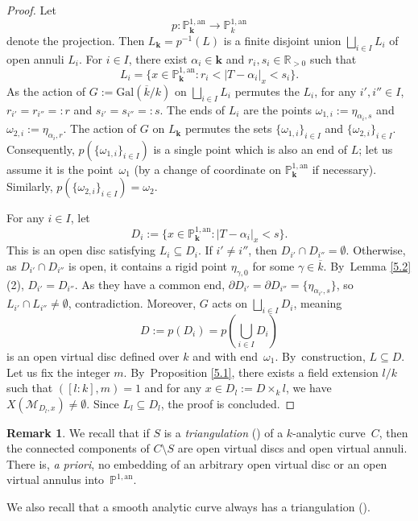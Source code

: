 \documentclass[JEP,XML,SOM,Unicode,NoFloatCountersInSection,published]{cedram}
\newcommand{\bbk}{{\boldsymbol{k}}}%
\let\backslash\setminus
\theoremstyle{definition}
\newtheorem{rem}[thm]{Remark}
\begin{document}
\begin{proof}
Let
\[
p: \mathbb{P}_{\bbk}^{1, \mathrm{an}} \to \mathbb{P}_k^{1, \mathrm{an}}
\]
denote the projection. Then $L_{\bbk}=p^{-1}(L)$ is a finite disjoint union $\bigsqcup_{i \in I} L_i$ of open annuli $L_i$. For $i \in I$, there exist $\alpha_i \in \bbk$ and $r_i, s_i \in \mathbb{R}_{>0}$ such that
\[
L_i=\{x \in \mathbb{P}_{\bbk}^{1, \mathrm{an}}: r_i < |T-\alpha_i|_x <s_i\}.
\]
As the action of $G:=\mathrm{Gal}(\overline{k}/k)$ on $\bigsqcup_{i \in I}L_i$ permutes the $L_i$, for any $i', i'' \in I$, $r_{i'}=r_{i''}=:r$ and $s_{i'}=s_{i''}=:s$. The ends of $L_i$ are the points $\omega_{1,i}:=\eta_{\alpha_i, s}$ and $\omega_{2,i}:=\eta_{\alpha_i,r}$. The action of $G$ on $L_{\bbk}$ permutes the sets $\{\omega_{1,i}\}_{i \in I}$ and $\{\omega_{2,i}\}_{i \in I}$. Consequently, $p(\{\omega_{1,i}\}_{i \in I})$ is a single point which is also an end of $L$; let us assume it is the point~$\omega_1$ (by a change of coordinate on $\mathbb{P}_{\bbk}^{1, \mathrm{an}}$ if necessary). Similarly, $p(\{\omega_{2,i}\}_{i \in I})=\omega_2$.

For any $i \in I$, let
\[
D_i:=\{x \in \mathbb{P}_{\bbk}^{1, \mathrm{an}}: |T-\alpha_i|_x <s\}.
\]
This is an open disc satisfying $L_i \subseteq D_i$. If $i' \neq i''$, then $D_{i'} \cap D_{i''} =\emptyset$. Otherwise, as $D_{i'} \cap D_{i''}$ is open, it contains a rigid point $\eta_{\gamma, 0}$ for some $\gamma \in \overline{k}$. By~Lemma \ref{5.2}(2), $D_{i'}=D_{i''}$.
As they have a common end, $\partial{D_{i'}}=\partial{D_{i''}}=\{\eta_{\alpha_{i'},s}\}$, so
$L_{i'} \cap L_{i''} \neq \emptyset$, contradiction. Moreover, $G$ acts on $\bigsqcup_{i \in I}D_i$, meaning
\[
D:=p(D_i)=p(\bigcup_{i \in I}D_i)
\]
is an open virtual disc defined over $k$ and with end~$\omega_1$. By~construction, $L \subseteq D$.
Let us fix the integer $m$. By~Proposition \ref{5.1}, there exists a field extension $l/k$ such that $([l:k], m)=1$ and for any $x \in D_{l}:=D \times_k l$, we have $X(\mathscr{M}_{D_l, x}) \neq \emptyset$. Since $L_l \subseteq D_l$, the proof is concluded.
\end{proof}

\begin{rem} \label{5.5.2}
We recall that if $S$ is a \emph{triangulation} (\cf \cite[5.1.13]{duc}) of a $k$-analytic curve~$C$, then the connected components of $C \backslash S$ are open virtual discs and open virtual annuli. There is, \emph{a priori}, no embedding of an arbitrary open virtual disc or an open virtual annulus into~$\mathbb{P}^{1, \mathrm{an}}$.

We also recall that a smooth analytic curve always has a triangulation (\cite[Th.\,5.1.14]{duc}).
\end{rem}
\end{document}
